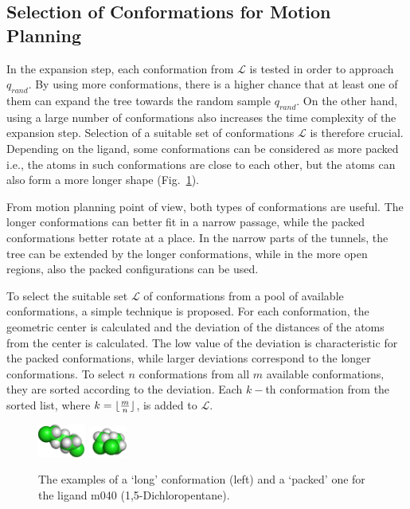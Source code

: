\documentclass[usletter, 10pt, conference]{ieeeconf} %
\def\qrand{q_{rand}}
\def\L{\mathcal{L}}
\begin{document}
\subsection{Selection of Conformations for Motion Planning}
\label{sec::strat}

In the expansion step, each conformation from $\L$ is tested in order to approach $\qrand$.
By using more conformations, there is a higher chance that at least one of them can expand the tree towards the random sample $\qrand$.
On the other hand, using a large number of conformations also increases the time complexity of the expansion step.
Selection of a suitable set of conformations $\L$ is therefore crucial.
Depending on the ligand, some conformations can be considered as more packed i.e., the atoms in such conformations are close to each other, but 
the atoms can also form a more longer shape (Fig.~\ref{fig::m040c}).

From motion planning point of view, both types of conformations are useful.
The longer conformations can better fit in a narrow passage, while the packed conformations better rotate at a place.
In the narrow parts of the tunnels, the tree can be extended by the longer conformations, while in the more open regions, also the
packed configurations can be used.

To select the suitable set $\L$ of conformations from a pool of available conformations, a simple technique is proposed.  
For each conformation, the geometric center is calculated and the deviation of the distances of the atoms from the center is calculated.
The low value of the deviation is characteristic for the packed conformations, while larger deviations correspond to the longer conformations.
To select $n$ conformations from all $m$ available conformations, they are sorted according to the deviation.
Each $k-$th conformation from the sorted list, where $k=\lfloor{m\over n}\rfloor$, is added to $\L$.

\begin{figure}
\centering
\includegraphics[width=0.14\textwidth]{fig/m040-conf1} \hskip 25pt
\includegraphics[width=0.11\textwidth]{fig/m040-conf2}
\caption{\label{fig::m040c}
 The examples of a `long' conformation (left) and a `packed' one for the ligand m040 (1,5-Dichloropentane).
}
\end{figure}
\end{document}
